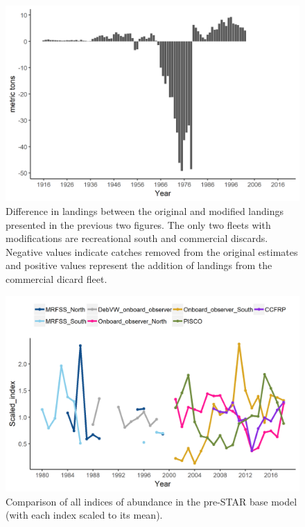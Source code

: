 \documentclass[12pt,]{article}
\begin{document}
\begin{figure}
\centering
\includegraphics{Figures/catches_difference.png}
\caption{Difference in landings between the original and modified
landings presented in the previous two figures. The only two fleets with
modifications are recreational south and commercial discards. Negative
values indicate catches removed from the original estimates and positive
values represent the addition of landings from the commercial dicard
fleet. \label{fig:catches_difference}}
\end{figure}

\FloatBarrier

\begin{figure}
\centering
\includegraphics{Figures/All_index_compare.png}
\caption{Comparison of all indices of abundance in the pre-STAR base
model (with each index scaled to its mean).
\label{fig:All_index_compare}}
\end{figure}
\end{document}
